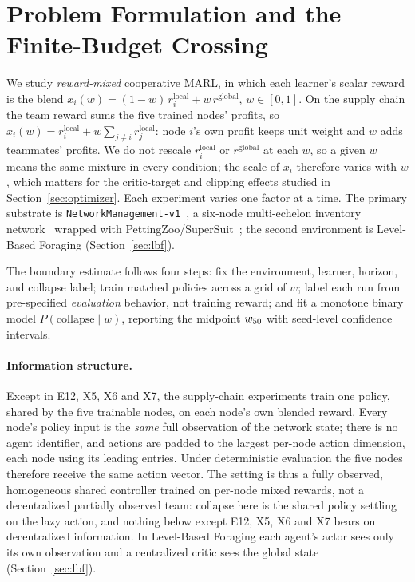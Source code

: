 
\section{Problem Formulation and the Finite-Budget Crossing}
\label{sec:method}

We study \emph{reward-mixed} cooperative MARL, in which each learner's scalar reward is the blend
$x_i(w)=(1-w)\,r_i^{\mathrm{local}}+w\,r^{\mathrm{global}}$, $w\in[0,\allowbreak 1]$. On the supply
chain the team reward sums the five trained nodes' profits, so
$x_i(w)=r_i^{\mathrm{local}}+w\sum_{j\neq i}r_j^{\mathrm{local}}$: node $i$'s own profit keeps unit
weight and $w$ adds teammates' profits. We do not rescale $r_i^{\mathrm{local}}$ or
$r^{\mathrm{global}}$ at each $w$, so a given $w$ means the same mixture in every condition; the scale of
$x_i$ therefore varies with $w$, which matters for the critic-target and clipping effects studied in
Section~\ref{sec:optimizer}. Each experiment varies one factor at a time. The primary substrate is
\texttt{NetworkManagement-v1}~\citep{hubbs2020orgym}, a six-node multi-echelon inventory
network~\citep{oroojlooyjadid2022,gijsbrechts2022,marlim2023} wrapped with
PettingZoo/SuperSuit~\citep{terry2021pettingzoo,terry2020supersuit}; the second environment is
Level-Based Foraging (Section~\ref{sec:lbf}).

The boundary estimate follows four steps: fix the environment, learner, horizon, and collapse
label; train matched policies across a grid of $w$; label each run from pre-specified
\emph{evaluation} behavior, not training reward; and fit a monotone binary model
$P(\mathrm{collapse}\mid w)$, reporting the midpoint $w_{50}$ with seed-level confidence intervals.

\paragraph{Information structure.}
Except in E12, X5, X6 and X7, the supply-chain experiments train one policy, shared by the five trainable nodes, on each node's own
blended reward. Every node's policy input is the \emph{same} full observation of the network state; there is
no agent identifier, and actions are padded to the largest per-node action dimension, each node using its
leading entries. Under deterministic evaluation the five nodes therefore receive the same action vector. The
setting is thus a fully observed, homogeneous shared controller trained on per-node mixed rewards, not a
decentralized partially observed team: collapse here is the shared policy settling on the lazy action, and
nothing below except E12, X5, X6 and X7 bears on decentralized information. In Level-Based Foraging each agent's actor sees
only its own observation and a centralized critic sees the global state (Section~\ref{sec:lbf}).

